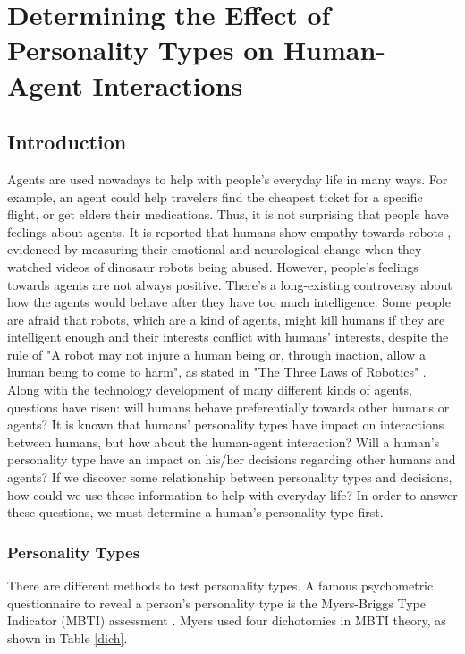 \chapter{Determining the Effect of Personality Types on Human-Agent Interactions}
\label{ch4}

\section{Introduction}
Agents are used nowadays to help with people's everyday life in many ways. For example, an agent could help travelers find the cheapest ticket for a specific flight, or get elders their medications. Thus, it is not surprising that people have feelings about agents. It is reported that humans show empathy towards robots  \cite{lewis2013}, evidenced by measuring their emotional and neurological change when they watched videos of dinosaur robots being abused. However, people's feelings towards agents are not always positive. There's a long-existing controversy about how the agents would behave after they have too much intelligence. Some people are afraid that robots, which are a kind of agents, might kill humans if they are intelligent enough and their interests conflict with humans' interests, despite the rule of "A robot may not injure a human being or, through inaction, allow a human being to come to harm", as stated in "The Three Laws of Robotics" \cite{asimov2004robot}. Along with the technology development of many different kinds of agents, questions have risen: will humans behave preferentially towards other humans or agents? It is known that humans' personality types have impact on interactions between humans, but how about the human-agent interaction? Will a human's personality type have an impact on his/her decisions regarding other humans and agents? If we discover some relationship between personality types and decisions, how could we use these information to help with everyday life? In order to answer these questions, we must determine a human's personality type first.

\subsection{Personality Types}
There are different methods to test personality types. A famous psychometric questionnaire to reveal a person's personality type is the Myers-Briggs Type Indicator (MBTI) assessment \cite{myers1980gifts}. Myers used four dichotomies in MBTI theory, as shown in Table \ref{dich}. 

